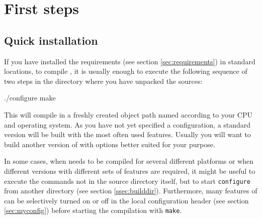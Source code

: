 %  
%   
%  
%  
%
\chapter{First steps}
\label{chap:firststeps}

\section{Quick installation}


If you have installed the requirements (see section
\vref{sec:requirements}) in standard locations, to compile \es{}, it
is usually enough to execute the following sequence of two steps in
the directory where you have unpacked the sources:
\begin{code}
./configure
make
\end{code}

This will compile \es in a freshly created object path named according
to your CPU and operating system. As you have not yet specified a
configuration, a standard version will be built with the most often
used features. Usually you will want to build another version of \es
with options better suited for your purpose.

In some cases, \eg when \es needs to be compiled for several different
platforms or when different versions with different sets of features
are required, it might be useful to execute the commands not in the
source directory itself, but to start \texttt{configure} from another
directory (see section \vref{ssec:builddir}). Furthermore, many
features of \es can be selectively turned on or off in the local
configuration header (see section \vref{sec:myconfig}) before starting
the compilation with \texttt{make}.

